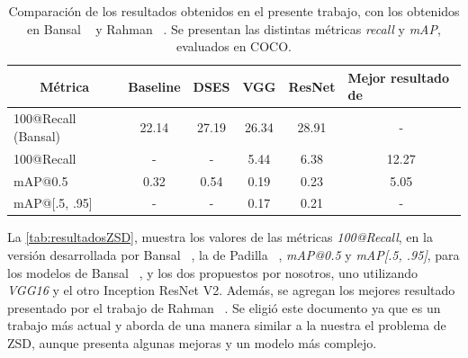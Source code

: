 \begin{table}[H]
	\centering
	\resizebox{\textwidth}{!} {
		\begin{tabular}{|l|c|c|c|c|c|}
			\hline
			\multicolumn{1}{|c|}{{Métrica}} & {Baseline \cite{bansal2018zero}} & \multicolumn{1}{l|}{{DSES \cite{bansal2018zero}}} & {VGG} & { ResNet} & \multicolumn{1}{l|}{{Mejor resultado de \cite{rahman2020zero}}} \\ \hline
			100@Recall (Bansal)             & 22.14                            & 27.19                                             & 26.34              & 28.91                 & -                                                               \\ \hline
			100@Recall                      & -                                & -                                                 & 5.44               & 6.38                  & 12.27                                                           \\ \hline
			mAP@0.5                         & 0.32                             & 0.54                                              & 0.19               & 0.23                  & 5.05                                                            \\ \hline
			mAP@[.5, .95]                   & -                                & -                                                 & 0.17               & 0.21                  & -                                                               \\ \hline
		\end{tabular}
	}
	\caption{Comparación de los resultados obtenidos en el presente trabajo, con los obtenidos en Bansal \etal~\cite{bansal2018zero} y Rahman \etal~\cite{rahman2020zero}. Se presentan las distintas métricas \textit{recall} y \textit{mAP}, evaluados en COCO.}
	\label{tab:resultadosZSD}
\end{table}


La \autoref{tab:resultadosZSD}, muestra los valores de las métricas \textit{100@Recall}, en la versión desarrollada por Bansal \etal~\cite{bansal2018zero}, la de Padilla \etal~\cite{padilla2020survey}, \textit{mAP@0.5} y \textit{mAP[.5, .95]}, para los modelos de Bansal \etal~\cite{bansal2018zero}, y los dos propuestos por nosotros, uno utilizando \textit{VGG16} y el otro Inception ResNet V2. Además, se agregan los mejores resultado presentado por el trabajo de Rahman \etal~\cite{rahman2020zero}. Se eligió este documento ya que es un trabajo más actual y aborda de una manera similar a la nuestra el problema de ZSD, aunque presenta algunas mejoras y un modelo más complejo.\\

